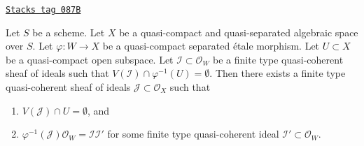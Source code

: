 \begin{lemma}
\label{spaces-more-morphisms-lemma-push-ideal}
\href{https://stacks.math.columbia.edu/tag/087B}{\texttt{Stacks tag 087B}}

Let $S$ be a scheme. Let $X$ be a quasi-compact and quasi-separated
algebraic space over $S$. Let $\varphi : W \to X$ be a quasi-compact
separated \'etale morphism. Let $U \subset X$ be a quasi-compact open
subspace. Let $\mathcal{I} \subset \mathcal{O}_W$ be a finite type
quasi-coherent sheaf of ideals such that
$V(\mathcal{I}) \cap \varphi^{-1}(U) = \emptyset$.
Then there exists a finite type quasi-coherent sheaf of ideals
$\mathcal{J} \subset \mathcal{O}_X$ such that
\begin{enumerate}
\item $V(\mathcal{J}) \cap U = \emptyset$, and
\item $\varphi^{-1}(\mathcal{J})\mathcal{O}_W = \mathcal{I} \mathcal{I}'$
for some finite type quasi-coherent ideal
$\mathcal{I}' \subset \mathcal{O}_W$.
\end{enumerate}
\end{lemma}


